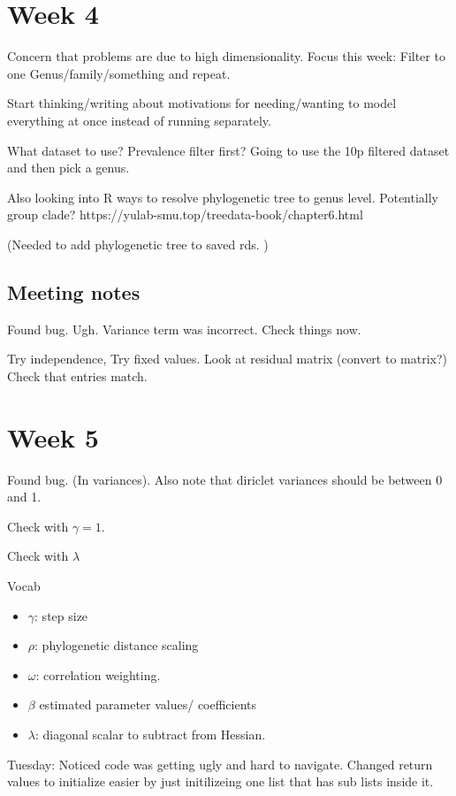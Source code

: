 \documentclass[10pt]{article}
\theoremstyle{definition}
\begin{document}
\section{Week 4}

Concern that problems are due to high dimensionality. Focus this week: Filter to one Genus/family/something and repeat.

Start thinking/writing about motivations for needing/wanting to model everything at once instead of running separately.

What dataset to use? Prevalence filter first?
Going to use the 10p filtered dataset and then pick a genus.

Also looking into R ways to resolve phylogenetic tree to genus level.
Potentially group clade? https://yulab-smu.top/treedata-book/chapter6.html

(Needed to add phylogenetic tree to saved rds. )


\subsection{Meeting notes}

Found bug. Ugh. Variance term was incorrect. Check things now.


Try independence,
Try fixed values.
Look at residual matrix (convert to matrix?)
Check that entries match.




\section{Week 5}

Found bug. (In variances). Also note that diriclet variances should be between 0 and 1.

Check with $\gamma = 1$.


Check with $\lambda$


Vocab
\begin{itemize}
  \item $\gamma$: step size
  \item $\rho$: phylogenetic distance scaling
  \item $\omega$: correlation weighting.
  \item $\beta$ estimated parameter values/ coefficients
  \item $\lambda$: diagonal scalar to subtract from Hessian.
\end{itemize}


Tuesday:
Noticed code was getting ugly and hard to navigate. Changed return values to initialize easier by just initilizeing one list that has sub lists inside it.
\end{document}
